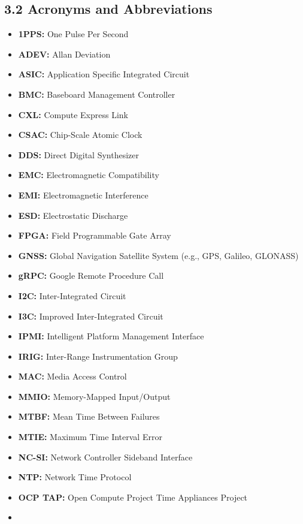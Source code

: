 \documentclass[
]{article}
\begin{document}
\subsection{3.2 Acronyms and
Abbreviations}\label{acronyms-and-abbreviations}

\begin{itemize}
\item
  \textbf{1PPS:} One Pulse Per Second
\item
  \textbf{ADEV:} Allan Deviation
\item
  \textbf{ASIC:} Application Specific Integrated Circuit
\item
  \textbf{BMC:} Baseboard Management Controller
\item
  \textbf{CXL:} Compute Express Link
\item
  \textbf{CSAC:} Chip-Scale Atomic Clock
\item
  \textbf{DDS:} Direct Digital Synthesizer
\item
  \textbf{EMC:} Electromagnetic Compatibility
\item
  \textbf{EMI:} Electromagnetic Interference
\item
  \textbf{ESD:} Electrostatic Discharge
\item
  \textbf{FPGA:} Field Programmable Gate Array
\item
  \textbf{GNSS:} Global Navigation Satellite System (e.g., GPS, Galileo,
  GLONASS)
\item
  \textbf{gRPC:} Google Remote Procedure Call
\item
  \textbf{I2C:} Inter-Integrated Circuit
\item
  \textbf{I3C:} Improved Inter-Integrated Circuit
\item
  \textbf{IPMI:} Intelligent Platform Management Interface
\item
  \textbf{IRIG:} Inter-Range Instrumentation Group
\item
  \textbf{MAC:} Media Access Control
\item
  \textbf{MMIO:} Memory-Mapped Input/Output
\item
  \textbf{MTBF:} Mean Time Between Failures
\item
  \textbf{MTIE:} Maximum Time Interval Error
\item
  \textbf{NC-SI:} Network Controller Sideband Interface
\item
  \textbf{NTP:} Network Time Protocol
\item
  \textbf{OCP TAP:} Open Compute Project Time Appliances Project
\item

\end{itemize}
\end{document}
